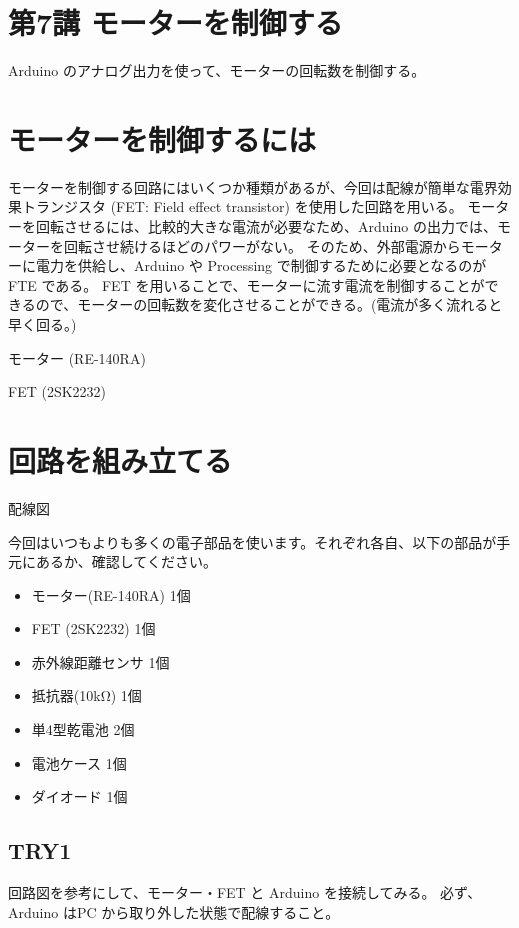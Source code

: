 \documentclass[11pt,a4paper]{jarticle}
\begin{document}
\section*{\LARGE{第7講 モーターを制御する}}
Arduino のアナログ出力を使って、モーターの回転数を制御する。


\section{モーターを制御するには}
モーターを制御する回路にはいくつか種類があるが、今回は配線が簡単な電界効果トランジスタ (FET: Field effect transistor) を使用した回路を用いる。
モーターを回転させるには、比較的大きな電流が必要なため、Arduino の出力では、モーターを回転させ続けるほどのパワーがない。
そのため、外部電源からモーターに電力を供給し、Arduino や Processing で制御するために必要となるのが FTE である。
FET を用いることで、モーターに流す電流を制御することができるので、モーターの回転数を変化させることができる。(電流が多く流れると早く回る。)

モーター (RE-140RA)

FET (2SK2232)

\section{回路を組み立てる}

配線図

今回はいつもよりも多くの電子部品を使います。それぞれ各自、以下の部品が手元にあるか、確認してください。
\begin{itemize}
 \item モーター(RE-140RA) 1個
 \item FET (2SK2232) 1個
 \item 赤外線距離センサ 1個
 \item 抵抗器(10kΩ) 1個
 \item 単4型乾電池 2個
 \item 電池ケース 1個
 \item ダイオード 1個
\end{itemize}

\subsection*{TRY1}
回路図を参考にして、モーター・FET と Arduino を接続してみる。
必ず、Arduino はPC から取り外した状態で配線すること。
\end{document}
